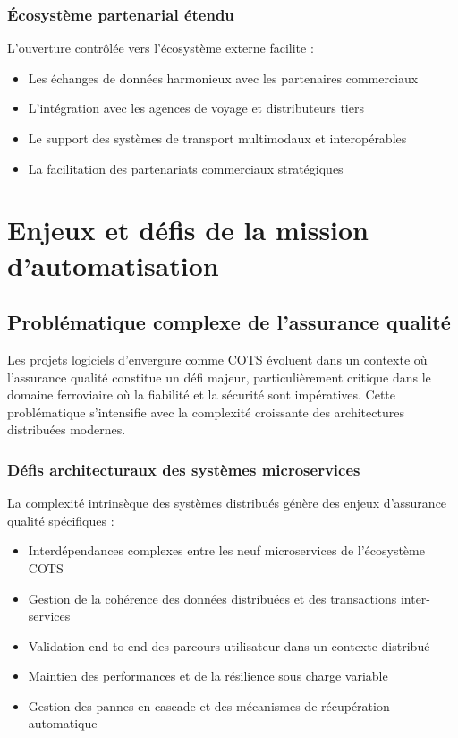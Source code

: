 \subsubsection{Écosystème partenarial étendu}
L'ouverture contrôlée vers l'écosystème externe facilite :
\begin{itemize}
    \item Les échanges de données harmonieux avec les partenaires commerciaux
    \item L'intégration avec les agences de voyage et distributeurs tiers
    \item Le support des systèmes de transport multimodaux et interopérables
    \item La facilitation des partenariats commerciaux stratégiques
\end{itemize}

\section{Enjeux et défis de la mission d'automatisation}

\subsection{Problématique complexe de l'assurance qualité}

Les projets logiciels d'envergure comme COTS évoluent dans un contexte où l'assurance qualité constitue un défi majeur, particulièrement critique dans le domaine ferroviaire où la fiabilité et la sécurité sont impératives. Cette problématique s'intensifie avec la complexité croissante des architectures distribuées modernes.

\subsubsection{Défis architecturaux des systèmes microservices}

La complexité intrinsèque des systèmes distribués génère des enjeux d'assurance qualité spécifiques :
\begin{itemize}
    \item Interdépendances complexes entre les neuf microservices de l'écosystème COTS
    \item Gestion de la cohérence des données distribuées et des transactions inter-services
    \item Validation end-to-end des parcours utilisateur dans un contexte distribué
    \item Maintien des performances et de la résilience sous charge variable
    \item Gestion des pannes en cascade et des mécanismes de récupération automatique
\end{itemize}


